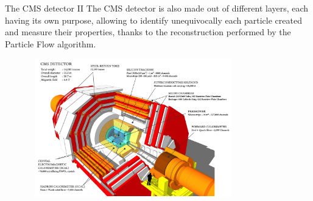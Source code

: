 \documentclass[8pt]{beamer}
\begin{document}
\begin{frame}{The CMS detector II}
\justifying
The CMS detector is also \alert{made out of different layers}, each having its own purpose, allowing to identify unequivocally each particle created and measure their properties, thanks to the reconstruction performed by the Particle Flow algorithm. \vfill

\begin{figure}[htbp]
\begin{center}
\includegraphics[width=9cm, height=6cm]{figs/CMS.png}
\end{center}
\end{figure} \vfill
\end{frame}
\end{document}
